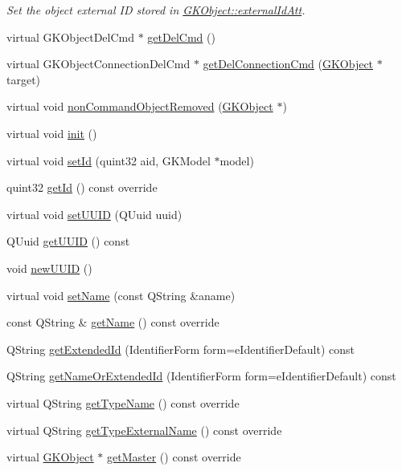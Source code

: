 \begin{DoxyCompactItemize}
\begin{DoxyCompactList}\small\item\em Set the object external ID stored in \hyperlink{classGKBaseObject_a8287b7ae2c1c41363d3ad44dfc53190a}{G\+K\+Object\+::external\+Id\+Att}. \end{DoxyCompactList}\item 
virtual G\+K\+Object\+Del\+Cmd $\ast$ \hyperlink{classGKObject_ac4a47dac5d37a254e97bee6946c755b7}{get\+Del\+Cmd} ()
\item 
virtual G\+K\+Object\+Connection\+Del\+Cmd $\ast$ \hyperlink{classGKObject_ada5bae3e25acd44a5468f62c62b962de}{get\+Del\+Connection\+Cmd} (\hyperlink{classGKObject}{G\+K\+Object} $\ast$target)
\item 
virtual void \hyperlink{classGKObject_a4c548e5fc63c0db5e35baf6eb57e9757}{non\+Command\+Object\+Removed} (\hyperlink{classGKObject}{G\+K\+Object} $\ast$)
\item 
virtual void \hyperlink{classGKObject_a8f390d9dc03ab2cf6d689a6a9b1fde65}{init} ()
\item 
virtual void \hyperlink{classGKObject_af09dcaede290d87fe1e5b727cf807b0f}{set\+Id} (quint32 aid, G\+K\+Model $\ast$model)
\item 
quint32 \hyperlink{classGKObject_a7b4db3e163ac785ffa386b07dbba6eea}{get\+Id} () const override
\item 
virtual void \hyperlink{classGKObject_a21afff8b02df6ddcacfc4da855b57870}{set\+U\+U\+ID} (Q\+Uuid uuid)
\item 
Q\+Uuid \hyperlink{classGKObject_a8d2ee8903f2519cefccbad25f5fdf8bc}{get\+U\+U\+ID} () const 
\item 
void \hyperlink{classGKObject_ab52114827dbfa4f5d06a9615ba574406}{new\+U\+U\+ID} ()
\item 
virtual void \hyperlink{classGKObject_a606d0a2f5513902ba8e3624817fdbf2b}{set\+Name} (const Q\+String \&aname)
\item 
const Q\+String \& \hyperlink{classGKObject_a4f5ba333d4cbe5c28a91088073faa6e0}{get\+Name} () const override
\item 
Q\+String \hyperlink{classGKObject_a5be9614346783ff71327b6abc6bc0607}{get\+Extended\+Id} (Identifier\+Form form=e\+Identifier\+Default) const 
\item 
Q\+String \hyperlink{classGKObject_a20956e302f753261a4b642e072063c5f}{get\+Name\+Or\+Extended\+Id} (Identifier\+Form form=e\+Identifier\+Default) const 
\item 
virtual Q\+String \hyperlink{classGKObject_a9b4135e10ab18e202dd71afe15018042}{get\+Type\+Name} () const override
\item 
virtual Q\+String \hyperlink{classGKObject_a7c36c406c513701b936759aedf6adfbc}{get\+Type\+External\+Name} () const override
\item 
virtual \hyperlink{classGKObject}{G\+K\+Object} $\ast$ \hyperlink{classGKObject_a1e26700bd67f942c7d12ca71b24eb462}{get\+Master} () const override\hypertarget{classGKObject_a1e26700bd67f942c7d12ca71b24eb462}{}\label{classGKObject_a1e26700bd67f942c7d12ca71b24eb462}


\end{DoxyCompactItemize}
